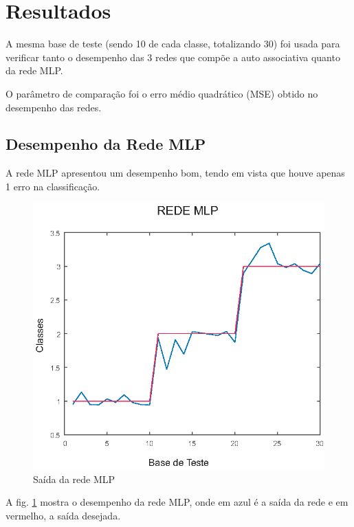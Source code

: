 \section{Resultados} \label{resultados}

A mesma base de teste (sendo 10 de cada classe, totalizando 30) foi usada para verificar tanto o desempenho das 3 redes que compõe a auto associativa quanto da rede MLP.

O parâmetro de comparação foi o erro médio quadrático (MSE) obtido no desempenho das redes.


\subsection{Desempenho da Rede MLP}

A rede MLP apresentou um desempenho bom, tendo em vista que houve apenas 1 erro na classificação.

\begin{figure}[H]

\centering %
\includegraphics{04-Figuras/SAIDA_MLP}

\caption{Saída da rede MLP}

\label{figura:saidaMLP}

\end{figure}

A fig. \ref{figura:saidaMLP} mostra o desempenho da rede MLP, onde em azul é a saída da rede e em vermelho, a saída desejada.



